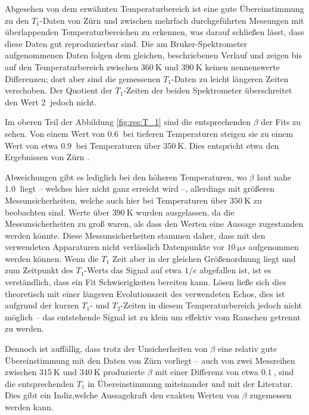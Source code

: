 Abgesehen von dem erwähnten Temperaturbereich ist eine gute Übereinstimmung zu den $T_1$-Daten von Zürn \cite{zuern_paper} und zwischen mehrfach durchgeführten Messungen mit überlappenden Temperaturbereichen zu erkennen, was darauf schließen lässt, dass diese Daten gut reproduzierbar sind. Die am Bruker-Spektrometer aufgenommenen Daten folgen dem gleichen, beschriebenen Verlauf und zeigen bis auf den Temperaturbereich zwischen $\SI{360}{\kelvin}$ und $\SI{390}{\kelvin}$ keinen nennenswerte Differenzen; dort aber sind die gemessenen $T_1$-Daten zu leicht längeren Zeiten verschoben. Der Quotient der $T_1$-Zeiten der beiden Spektrometer überschreitet den Wert $\SI{2}{}$ jedoch nicht.

Im oberen Teil der Abbildung \ref{fig:res:T_1} sind die entsprechenden $\beta$ der Fits zu sehen. Von einem Wert von $\SI{0.6}{}$ bei tieferen Temperaturen steigen sie zu einem Wert von etwa $\SI{0.9}{}$ bei Temperaturen über $\SI{350}{\kelvin}$. Dies entspricht etwa den Ergebnissen von Zürn \cite{zuern_paper}.

Abweichungen gibt es lediglich bei den höheren Temperaturen, wo $\beta$ laut  nahe $\SI{1.0}{}$ liegt -- welches hier nicht ganz erreicht wird --, allerdings mit größeren Messunsicherheiten, welche auch hier bei Temperaturen über $\SI{350}{\kelvin}$ zu beobachten sind. Werte über $\SI{390}{\kelvin}$ wurden ausgelassen, da die Messunsicherheiten zu groß waren, als dass den Werten eine Aussage zugestanden werden könnte. Diese Messunsicherheiten stammen daher, dass mit den verwendeten Apparaturen nicht verlässlich Datenpunkte vor $\SI{10}{\micro s}$ aufgenommen werden können. Wenn die $T_1$ Zeit aber in der gleichen Größenordnung liegt und zum Zeitpunkt des $T_1$-Werts das Signal auf etwa $1/e$ abgefallen ist, ist es verständlich, dass ein Fit Schwierigkeiten bereiten kann. Lösen ließe sich dies theoretisch mit einer längeren Evolutionszeit des verwendeten Echos, dies ist aufgrund der kurzen $T_1$- und $T_2$-Zeiten in diesem Temperaturbereich jedoch nicht möglich -- das entstehende Signal ist zu klein um effektiv vom Rauschen getrennt zu werden.

Dennoch ist auffällig, dass trotz der Unsicherheiten von $\beta$ eine relativ gute Übereinstimmung mit den Daten von Zürn vorliegt -- auch von zwei Messreihen zwischen $\SI{315}{\kelvin}$ und $\SI{340}{\kelvin}$ produzierte $\beta$ mit einer Differenz von etwa $\SI{0.1}{}$, sind die entsprechenden $T_1$ in Übereinstimmung miteinander und mit der Literatur. Dies gibt ein Indiz,welche Aussagekraft den exakten Werten von $\beta$ zugemessen werden kann.

